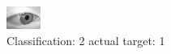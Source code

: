 \begin{figure}[h!]
\begin{center}
\includegraphics[width=0.60\columnwidth]{figures/ID2724_class_2_target_1.png}
\end{center}
\caption{ Classification: 2 actual target: 1}
\label{fig:ID2724_class_2_target_1}
\end{figure}
